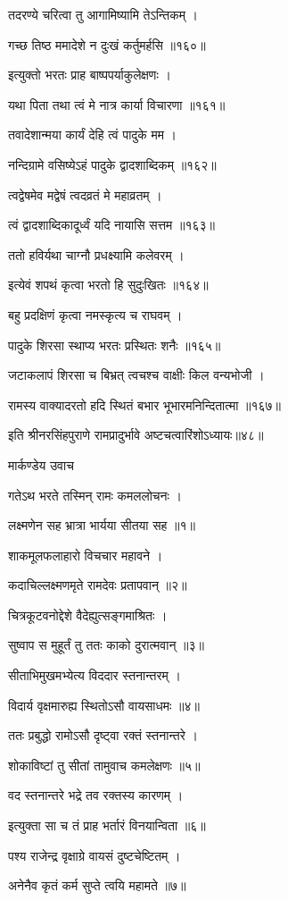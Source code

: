 तदरण्ये चरित्वा तु आगामिष्यामि तेऽन्तिकम् ।

गच्छ तिष्ठ ममादेशे न दुःखं कर्तुमर्हसि ॥१६०॥

इत्युक्तो भरतः प्राह बाष्पपर्याकुलेक्षणः ।

यथा पिता तथा त्वं मे नात्र कार्या विचारणा ॥१६१॥

तवादेशान्मया कार्यं देहि त्वं पादुके मम ।

नन्दिग्रामे वसिष्येऽहं पादुके द्वादशाब्दिकम् ॥१६२॥

त्वद्वेषमेव मद्वेषं त्वदव्रतं मे महाव्रतम् ।

त्वं द्वादशाब्दिकादूर्ध्वं यदि नायासि सत्तम ॥१६३॥

ततो हविर्यथा चाग्नौ प्रधक्ष्यामि कलेवरम् ।

इत्येवं शपथं कृत्वा भरतो हि सुदुःखितः ॥१६४॥

बहु प्रदक्षिणं कृत्वा नमस्कृत्य च राघवम् ।

पादुके शिरसा स्थाप्य भरतः प्रस्थितः शनैः ॥१६५॥

जटाकलापं शिरसा च बिभ्रत् त्वचश्च वाक्षीः किल वन्यभोजी ।

रामस्य वाक्यादरतो हदि स्थितं बभार भूभारमनिन्दितात्मा ॥१६७॥

इति श्रीनरसिंहपुराणे रामप्रादुर्भावे अष्टचत्वारिंशोऽध्यायः॥४८॥


मार्कण्डेय उवाच

गतेऽथ भरते तस्मिन् रामः कमललोचनः ।

लक्ष्मणेन सह भ्रात्रा भार्यया सीतया सह ॥१॥

शाकमूलफलाहारो विचचार महावने ।

कदाचिल्लक्ष्मणमृते रामदेवः प्रतापवान् ॥२॥

चित्रकूटवनोद्देशे वैदेह्युत्सङ्गमाश्रितः ।

सुष्वाप स मुहूर्तं तु ततः काको दुरात्मवान् ॥३॥

सीताभिमुखमभ्येत्य विददार स्तनान्तरम् ।

विदार्य वृक्षमारुह्य स्थितोऽसौ वायसाधमः ॥४॥

ततः प्रबुद्धो रामोऽसौ दृष्ट्वा रक्तं स्तनान्तरे ।

शोकाविष्टां तु सीतां तामुवाच कमलेक्षणः ॥५॥

वद स्तनान्तरे भद्रे तव रक्तस्य कारणम् ।

इत्युक्ता सा च तं प्राह भर्तारं विनयान्विता ॥६॥

पश्य राजेन्द्र वृक्षाग्रे वायसं दुष्टचेष्टितम् ।

अनेनैव कृतं कर्म सुप्ते त्वयि महामते ॥७॥

